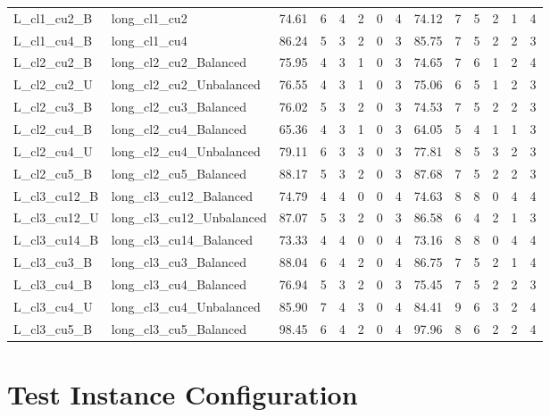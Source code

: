 \documentclass[3p,11pt,authoryear]{elsarticle}  %
\begin{document}
\begin{table}[htbp]
{\begin{tabular}{@{}llrrrrrrrrrrrr@{}}
L\_cl1\_cu2\_B & long\_cl1\_cu2 & 74.61 & 6 & 4 & 2 & 0 & 4 & 74.12 & 7 & 5 & 2 & 1 & 4 \\
L\_cl1\_cu4\_B & long\_cl1\_cu4 & 86.24 & 5 & 3 & 2 & 0 & 3 & 85.75 & 7 & 5 & 2 & 2 & 3 \\
L\_cl2\_cu2\_B & long\_cl2\_cu2\_Balanced & 75.95 & 4 & 3 & 1 & 0 & 3 & 74.65 & 7 & 6 & 1 & 2 & 4 \\
L\_cl2\_cu2\_U & long\_cl2\_cu2\_Unbalanced & 76.55 & 4 & 3 & 1 & 0 & 3 & 75.06 & 6 & 5 & 1 & 2 & 3 \\
L\_cl2\_cu3\_B & long\_cl2\_cu3\_Balanced & 76.02 & 5 & 3 & 2 & 0 & 3 & 74.53 & 7 & 5 & 2 & 2 & 3 \\
L\_cl2\_cu4\_B & long\_cl2\_cu4\_Balanced & 65.36 & 4 & 3 & 1 & 0 & 3 & 64.05 & 5 & 4 & 1 & 1 & 3 \\
L\_cl2\_cu4\_U & long\_cl2\_cu4\_Unbalanced & 79.11 & 6 & 3 & 3 & 0 & 3 & 77.81 & 8 & 5 & 3 & 2 & 3 \\
L\_cl2\_cu5\_B & long\_cl2\_cu5\_Balanced & 88.17 & 5 & 3 & 2 & 0 & 3 & 87.68 & 7 & 5 & 2 & 2 & 3 \\
L\_cl3\_cu12\_B & long\_cl3\_cu12\_Balanced & 74.79 & 4 & 4 & 0 & 0 & 4 & 74.63 & 8 & 8 & 0 & 4 & 4 \\
L\_cl3\_cu12\_U & long\_cl3\_cu12\_Unbalanced & 87.07 & 5 & 3 & 2 & 0 & 3 & 86.58 & 6 & 4 & 2 & 1 & 3 \\
L\_cl3\_cu14\_B & long\_cl3\_cu14\_Balanced & 73.33 & 4 & 4 & 0 & 0 & 4 & 73.16 & 8 & 8 & 0 & 4 & 4 \\
L\_cl3\_cu3\_B & long\_cl3\_cu3\_Balanced & 88.04 & 6 & 4 & 2 & 0 & 4 & 86.75 & 7 & 5 & 2 & 1 & 4 \\
L\_cl3\_cu4\_B & long\_cl3\_cu4\_Balanced & 76.94 & 5 & 3 & 2 & 0 & 3 & 75.45 & 7 & 5 & 2 & 2 & 3 \\
L\_cl3\_cu4\_U & long\_cl3\_cu4\_Unbalanced & 85.90 & 7 & 4 & 3 & 0 & 4 & 84.41 & 9 & 6 & 3 & 2 & 4 \\
L\_cl3\_cu5\_B & long\_cl3\_cu5\_Balanced & 98.45 & 6 & 4 & 2 & 0 & 4 & 97.96 & 8 & 6 & 2 & 2 & 4 \\
\bottomrule
\end{tabular}%
}
\end{table}






\section{Test Instance Configuration}\label{appendix:Test_Instance}
\end{document}
